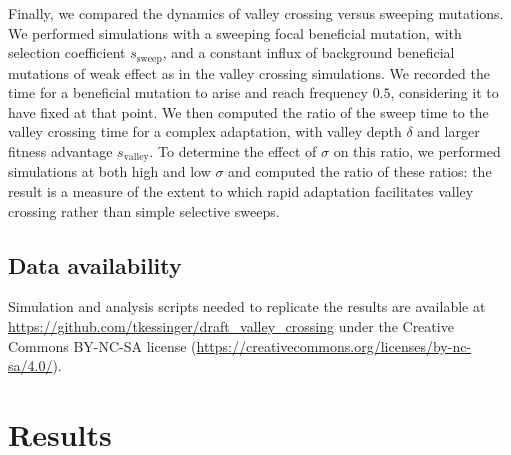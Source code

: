 \documentclass[10pt,twocolumn,twoside]{gsajnl}
\begin{document}
\begin{spacing}{1.5}
Finally, we compared the dynamics of valley crossing versus sweeping mutations.
We performed simulations with a sweeping focal beneficial mutation, with selection coefficient $s_{\mathrm{sweep}}$, and a constant influx of background beneficial mutations of weak effect as in the valley crossing simulations.
We recorded the time for a beneficial mutation to arise and reach frequency $0.5$, considering it to have fixed at that point.
We then computed the ratio of the sweep time to the valley crossing time for a complex adaptation, with valley depth $\delta$ and larger fitness advantage $s_{\mathrm{valley}}$.
To determine the effect of $\sigma$ on this ratio, we performed simulations at both high and low $\sigma$ and computed the ratio of these ratios: the result is a measure of the extent to which rapid adaptation facilitates valley crossing rather than simple selective sweeps.

\subsection*{Data availability}

Simulation and analysis scripts needed to replicate the results are available at \url{https://github.com/tkessinger/draft_valley_crossing} under the Creative Commons BY-NC-SA license (\url{https://creativecommons.org/licenses/by-nc-sa/4.0/}).

\section{Results}


\end{spacing}
\end{document}
